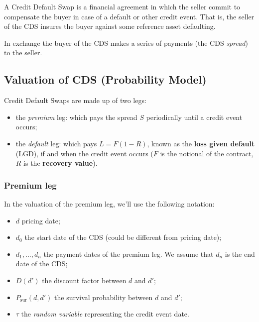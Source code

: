 
A Credit Default Swap is a financial agreement in which the seller commit to compensate the buyer in case of a default or other credit event. That is, the seller of the CDS insures the buyer against some reference asset defaulting. 

In exchange the buyer of the CDS makes a series of payments (the CDS \emph{spread}) to the seller.

\subsection{Valuation of CDS (Probability Model)}
\label{sec:cds_valuation}

Credit Default Swaps are made up of two legs:

\begin{itemize}
\tightlist
\item
  the \emph{premium} leg: which pays the spread \(S\) periodically until a credit event occurs;
\item
  the \emph{default} leg: which pays \(L = F(1 - R)\), known as the
  \textbf{loss given default} (LGD), if and when the credit event occurs ($F$ is the notional of the contract, $R$ is the \textbf{recovery value}).
\end{itemize}

\subsubsection{Premium leg}\label{premium-leg}

In the valuation of the premium leg, we'll use the following notation:

\begin{itemize}
\tightlist
\item
  \(d\) pricing date;
\item
  \(d_0\) the start date of the CDS (could be different from pricing date);
\item
  \(d_1, ..., d_n\) the payment dates of the premium leg. We assume that \(d_n\) is the end date of the CDS;
\item
  \(D(d')\) the discount factor between \(d\) and \(d'\);
\item
  $P_{\textrm{sur}}(d, d')$ the survival probability between \(d\) and \(d'\);
\item
  \(\tau\) the \emph{random variable} representing the credit event date.
\end{itemize}

